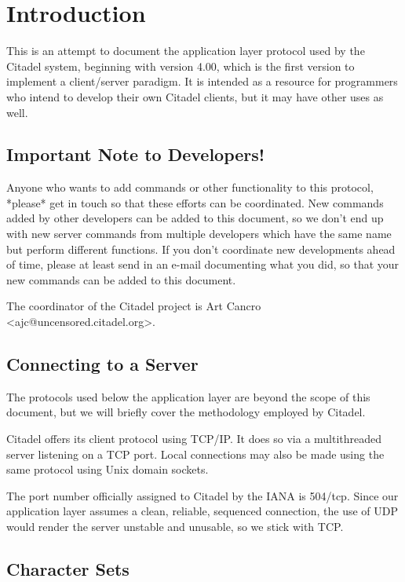 \chapter{Introduction}

This is an attempt to document the application layer protocol used by the
Citadel system, beginning with version 4.00, which is the first version to
implement a client/server paradigm.  It is intended as a resource for
programmers who intend to develop their own Citadel clients, but it may have
other uses as well.


\section{Important Note to Developers!}

 Anyone who wants to add commands or other functionality to this protocol,
*please* get in touch so that these efforts can be coordinated.  New
commands added by other developers can be added to this document, so we
don't end up with new server commands from multiple developers which have
the same name but perform different functions.  If you don't coordinate new
developments ahead of time, please at least send in an e-mail documenting
what you did, so that your new commands can be added to this document.

 The coordinator of the Citadel project is Art Cancro
<ajc@uncensored.citadel.org>.


\section{Connecting to a Server}

 The protocols used below the application layer are beyond the scope of this
document, but we will briefly cover the methodology employed by Citadel.

 Citadel offers its client protocol using TCP/IP.  It does so via a
multithreaded server listening on a TCP port.  Local connections may also
be made using the same protocol using Unix domain sockets.

 The port number officially assigned to Citadel by the IANA is 504/tcp.  Since
our application layer assumes a clean, reliable, sequenced connection, the use
of UDP would render the server unstable and unusable, so we stick with TCP.


\section{Character Sets}

